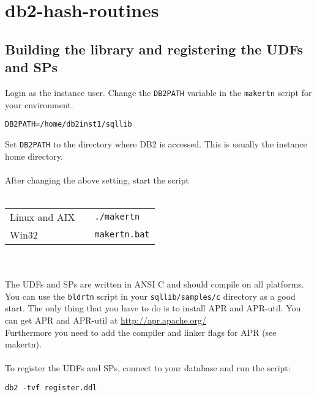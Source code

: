 \section{db2-hash-routines}
\subsection{Building the library and registering the UDFs and SPs}
Login as the instance user. Change the {\tt DB2PATH} variable in the {\tt makertn} script for your environment.
\begin{verbatim}
DB2PATH=/home/db2inst1/sqllib
\end{verbatim}
Set {\tt DB2PATH} to the directory where DB2 is accessed. This is usually the instance home directory.\\
\\
After changing the above setting, start the script\\
\\
\begin{tabular}{@{} lll @{}}
Linux and AIX & & {\tt ./makertn}\\
Win32         & & {\tt makertn.bat}\\
\end{tabular}
\\\\
The UDFs and SPs are written in ANSI C and should compile on all platforms.
You can use the {\tt bldrtn} script in your {\tt sqllib/samples/c} directory as a good start.
The only thing that you have to do is to install APR and \mbox{APR-util}.
You can get APR and APR-util at \url{http://apr.apache.org/} \\
Furthermore you need to add the compiler and linker flags for APR (see makertn).\\
\\
To register the UDFs and SPs, connect to your database and run the script:
\begin{verbatim}
db2 -tvf register.ddl
\end{verbatim}
\newpage
